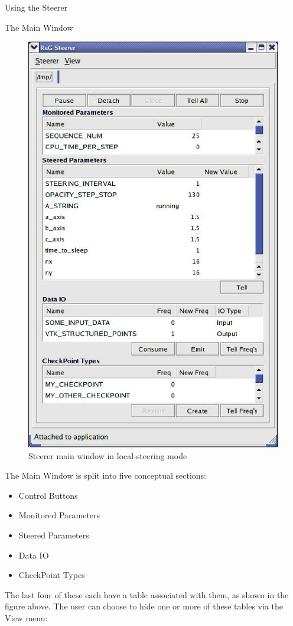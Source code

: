\documentclass[a4paper,twoside]{article}
\begin{document}
\begin{section}{Using the Steerer}

\begin{subsection}{The Main Window}

\begin{figure}
\centerline{\includegraphics{main_local.eps}}
\caption{Steerer main window in local-steering mode}
\label{fig:main_local}
\end{figure}

The Main Window is split into five conceptual sections:
\begin{itemize}
\item Control Buttons
\item Monitored Parameters
\item Steered Parameters
\item Data IO
\item CheckPoint Types
\end{itemize}
The last four of these each have a table associated with them, as
shown in the figure above.  The user can choose to hide one or more of
these tables via the View menu:


\end{subsection}
\end{section}
\end{document}
